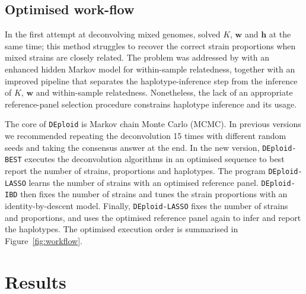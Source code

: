 \documentclass{bioinfo}
\begin{document}
\subsection{Optimised work-flow}

In the first attempt at deconvolving mixed genomes, \citet{Zhu2017} solved $K$, $\mathbf{w}$ and $\mathbf{h}$ at the same time; this method struggles to recover the correct strain proportions when mixed strains are closely related. The problem was addressed by \citet{Zhu2019} with an enhanced hidden Markov model for within-sample relatedness, together with an improved pipeline that separates the haplotype-inference step from the inference of $K$, $\mathbf{w}$ and within-sample relatedness. Nonetheless, the lack of an appropriate reference-panel selection procedure constrains haplotype inference and its usage.

The core of \texttt{DEploid} is Markov chain Monte Carlo (MCMC). In previous versions we recommended repeating the deconvolution 15 times with different random seeds and taking the consensus answer at the end. In the new version, {\tt DEploid-BEST} executes the deconvolution algorithms in an optimised sequence to best report the number of strains, proportions and haplotypes. The program {\tt DEploid-LASSO} learns the number of strains with an optimised reference panel. {\tt DEploid-IBD} then fixes the number of strains and tunes the strain proportions with an identity-by-descent model. Finally, {\tt DEploid-LASSO} fixes the number of strains and proportions, and uses the optimised reference panel again to infer and report the haplotypes. The optimised execution order is
summarised in Figure~\ref{fig:workflow}.

\section{Results}
\end{document}
